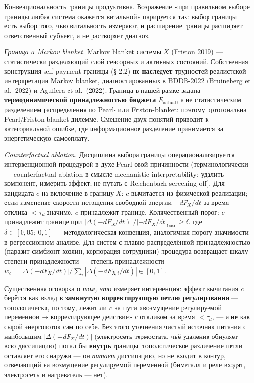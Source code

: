 \documentclass[pdflatex,sn-mathphys-ay]{sn-jnl}
\begin{document}
Конвенциональность границы продуктивна. Возражение «при правильном выборе границы любая система окажется витальной» парируется так: выбор границы есть выбор того, чью витальность измеряют, и расширение границы расширяет ответственный субъект, а не растворяет диагноз.

\emph{Граница и Markov blanket.} Markov blanket системы \(X\) (Friston 2019) --- статистически разделяющий слой сенсорных и активных состояний. Собственная конструкция self-payment-границы (§ 2.2) \textbf{не наследует} трудностей реалистской интерпретации Markov blanket, диагностированных в BDDB-2022 (Bruineberg et al.~2022) и Aguilera et al.~(2022). Граница в нашей рамке задана \textbf{термодинамической принадлежностью бюджета} \(E_{\text{actual}}\), а не статистическим разделением распределения по Pearl- или Friston-blanket; поэтому ортогональна Pearl/Friston-blanket дилемме. Смешение двух понятий приводит к категориальной ошибке, где информационное разделение принимается за энергетическую самооплату.

\emph{Counterfactual ablation.} Дисциплина выбора границы операционализируется интервенционной процедурой в духе Pearl-овой причинности (терминологически --- counterfactual ablation в смысле mechanistic interpretability: удалить компонент, измерить эффект; не путать с Reichenbach screening-off). Для кандидата \(c\) на включение в границу \(X\): \(c\) вычитается из физической реализации; если изменение скорости истощения свободной энергии \(-dF_X/dt\) за время отклика \(< \tau_d\) значимо, \(c\) принадлежит границе. Количественный порог: \(c\) принадлежит границе при \(|\Delta(-dF_X/dt)| / |-dF_X/dt|_{\text{base}} \ge \delta\), где \(\delta \in [0{,}05;\, 0{,}1]\) --- методологическая конвенция, аналогичная порогу значимости в регрессионном анализе. Для систем с плавно распределённой принадлежностью (паразит-симбионт-хозяин, корпорация-сотрудники) процедура возвращает шкалу степени принадлежности --- степень принадлежности \(w_c = |\Delta(-dF_X/dt)| / \sum_i |\Delta(-dF_{X,i}/dt)| \in [0, 1]\).

Существенная оговорка о \emph{том, что} измеряет интервенция: эффект вычитания \(c\) берётся как вклад в \textbf{замкнутую корректирующую петлю регулирования} --- топологически, по тому, лежит ли \(c\) на пути «возмущение регулируемой переменной → корректирующее действие» с откликом за время \(< \tau_d\), --- а \textbf{не} как сырой энергопоток сам по себе. Без этого уточнения чистый источник питания с наибольшим \(|\Delta(-dF_X/dt)|\) (электросеть термостата, чьё удаление обнуляет всю диссипацию) попал бы \textbf{внутрь} границы; топологическое различение петли оставляет его снаружи --- он \emph{питает} диссипацию, но не входит в контур, отвечающий на возмущение регулируемой переменной (биметалл и реле входят, электросеть и нагреватель --- нет).
\end{document}
